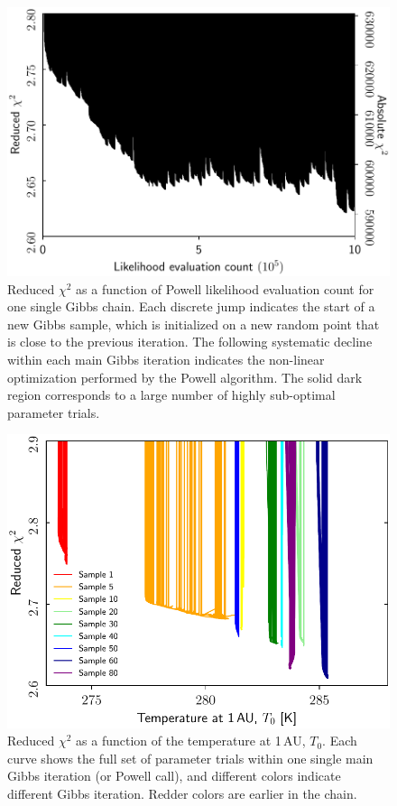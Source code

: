 \documentclass[twocolumn]{aa}
\begin{document}
\begin{figure}[t]
    \centering
    \includegraphics[width=\linewidth]{figs/powell_red_chisq_vs_iter.pdf}
    \caption{Reduced $\chi^2$ as a function of Powell likelihood evaluation count for one single Gibbs chain. Each discrete jump indicates the start of a new Gibbs sample, which is initialized on a new random point that is close to the previous iteration. The following systematic decline within each main Gibbs iteration indicates the non-linear optimization performed by the Powell algorithm.  The solid dark region corresponds to a large number of highly sub-optimal parameter trials. }
    \label{fig:powell_chisq_iter}
\end{figure}




\begin{figure}[t]
    \centering
    \includegraphics[width=\linewidth]{figs/powell_T0_vs_chisq.pdf}
    \caption{Reduced $\chi^2$ as a function of the temperature at 1\,AU, $T_0$. Each curve shows the full set of parameter trials within one single main Gibbs iteration (or Powell call), and different colors indicate different Gibbs iteration. Redder colors are earlier in the chain.}
    \label{fig:powell_T0}
\end{figure}
\end{document}
